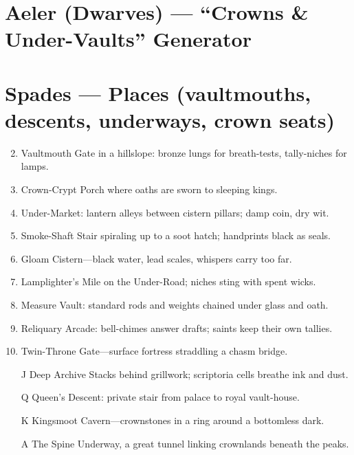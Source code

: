 \section{Aeler (Dwarves) --- ``Crowns \& Under-Vaults'' Generator}
\label{chap:aeler}

\section*{Spades --- Places (vaultmouths, descents, underways, crown seats)}
\label{sec:aeler-places}
\begin{enumerate}
\setcounter{enumi}{1}
\item Vaultmouth Gate in a hillslope: bronze lungs for breath-tests, tally-niches for lamps.
\item Crown-Crypt Porch where oaths are sworn to sleeping kings.
\item Under-Market: lantern alleys between cistern pillars; damp coin, dry wit.
\item Smoke-Shaft Stair spiraling up to a soot hatch; handprints black as seals.
\item Gloam Cistern---black water, lead scales, whispers carry too far.
\item Lamplighter's Mile on the Under-Road; niches sting with spent wicks.
\item Measure Vault: standard rods and weights chained under glass and oath.
\item Reliquary Arcade: bell-chimes answer drafts; saints keep their own tallies.
\item Twin-Throne Gate---surface fortress straddling a chasm bridge.
\item[J] Deep Archive Stacks behind grillwork; scriptoria cells breathe ink and dust.
\item[Q] Queen's Descent: private stair from palace to royal vault-house.
\item[K] Kingsmoot Cavern---crownstones in a ring around a bottomless dark.
\item[A] The Spine Underway, a great tunnel linking crownlands beneath the peaks.
\end{enumerate}

